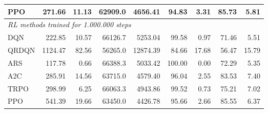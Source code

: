 \begin{samepage}
\begin{center}
\begin{tabular}{l|rr|rr|rr|rr}
    PPO          &   271.66 &    11.13 &    62909.0 &    4656.41 &   94.83 &    3.31 &   85.73 &    5.81 \\
    \midrule
    \multicolumn{9}{l}{\textit{RL methods trained for 1.000.000 steps}} \\
    \midrule
    DQN          &   222.85 &    10.57 &    66126.7 &    5253.04 &   99.58 &    0.97 &   71.46 &    5.51 \\
    QRDQN        &  1124.47 &    82.56 &    56265.0 &   12874.39 &   84.66 &   17.68 &   56.47 &   15.79 \\
    ARS          &   117.78 &     0.66 &    66388.3 &    5033.42 &  100.00 &    0.00 &   72.29 &    5.35 \\
    A2C          &   285.91 &    14.56 &    63715.0 &    4579.40 &   96.04 &    2.55 &   83.53 &    7.40 \\
    TRPO         &   298.99 &     6.25 &    66063.3 &    4943.86 &   99.52 &    0.73 &   75.21 &    7.02 \\
    PPO          &   541.39 &    19.66 &    63450.0 &    4426.78 &   95.66 &    2.66 &   85.55 &    6.37 \\
    \bottomrule
  \end{tabular}
\end{center}
\end{samepage}

